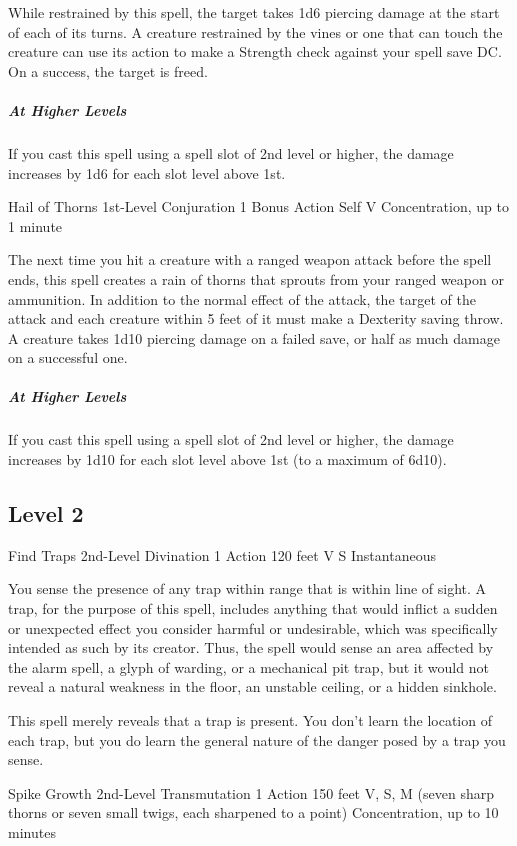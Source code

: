 \documentclass[letterpaper,openany,oneside,twocolumn]{book}
\begin{document}
While restrained by this spell, the target takes 1d6 piercing damage at the start of each of its turns. A creature restrained by the vines or one that can touch the creature can use its action to make a Strength check against your spell save DC. On a success, the target is freed.

\subparagraph*{At Higher Levels} If you cast this spell using a spell slot of 2nd level or higher, the damage increases by 1d6 for each slot level above 1st.

\DndSpellHeader
  {Hail of Thorns}
  {1st-Level Conjuration}
  {1 Bonus Action}
  {Self}
  {V}
  {Concentration, up to 1 minute}

The next time you hit a creature with a ranged weapon attack before the spell ends, this spell creates a rain of thorns that sprouts from your ranged weapon or ammunition. In addition to the normal effect of the attack, the target of the attack and each creature within 5 feet of it must make a Dexterity saving throw. A creature takes 1d10 piercing damage on a failed save, or half as much damage on a successful one.

\subparagraph{At Higher Levels} If you cast this spell using a spell slot of 2nd level or higher, the damage increases by 1d10 for each slot level above 1st (to a maximum of 6d10).

\subsection*{Level 2}

\DndSpellHeader
  {Find Traps}
  {2nd-Level Divination}
  {1 Action}
  {120 feet}
  {V S}
  {Instantaneous}

You sense the presence of any trap within range that is within line of sight. A trap, for the purpose of this spell, includes anything that would inflict a sudden or unexpected effect you consider harmful or undesirable, which was specifically intended as such by its creator. Thus, the spell would sense an area affected by the alarm spell, a glyph of warding, or a mechanical pit trap, but it would not reveal a natural weakness in the floor, an unstable ceiling, or a hidden sinkhole.

This spell merely reveals that a trap is present. You don't learn the location of each trap, but you do learn the general nature of the danger posed by a trap you sense.

\DndSpellHeader
  {Spike Growth}
  {2nd-Level Transmutation}
  {1 Action}
  {150 feet}
  {V, S, M (seven sharp thorns or seven small twigs, each sharpened to a point)}
  {Concentration, up to 10 minutes}
\end{document}
